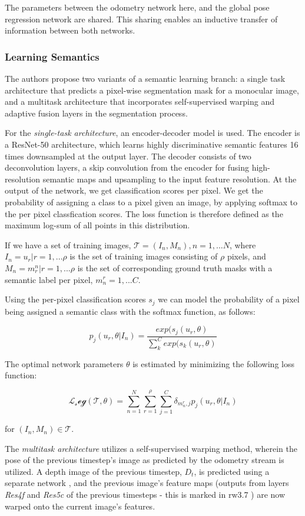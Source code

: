 The parameters between the odometry network here, and the global pose regression network are shared. This sharing enables an inductive transfer of information between
both networks. 

\subsubsection{Learning Semantics}
The authors propose two variants of a semantic learning branch: a single task architecture that predicts a pixel-wise segmentation mask for a monocular image, 
and a multitask architecture that incorporates self-supervised warping and adaptive fusion layers in the segmentation process. 


For the \emph{single-task architecture}, an encoder-decoder model is used. The encoder is a ResNet-50 architecture, which learns highly discriminative semantic features
16 times downsampled at the output layer. The decoder consists of two deconvolution layers, a skip convolution from the encoder for fusing high-resolution semantic maps
and upsampling to the input feature resolution. At the output of the network, we get classification scores per pixel. We get the probability of assigning a class to 
a pixel given an image, by applying softmax to the per pixel classfication scores. The loss function is therefore defined as the maximum log-sum of all points in this distribution. 


If we have a set of training images, $\mathcal{T} = {(I_n, M_n), n = 1,...N}$, where $I_n = {u_r | r = 1,...\rho}$ is the set of training images consisting of $\rho$ pixels, and $M_n = {m^n_r | r = 1,...\rho}$ is the set of corresponding ground truth masks with a semantic label per pixel, $m_n^r = {1,...C}$.

Using the per-pixel classification scores $s_j$ we can model the probability of a pixel being assigned a semantic class with the softmax function, as follows:

\[p_j(u_r, \theta | I_n) = \frac{exp(s_j(u_r, \theta)}{\sum_{k}^{C}exp(s_k(u_r, \theta)}\]

The optimal network parameters $\theta$ is estimated by minimizing the following loss function:

\[\mathcal{L_seg}(\mathcal{T}, \theta) = \sum_{n=1}^{N}\sum_{r=1}^{\rho}\sum_{j=1}^{C} \delta_{m_n^r, j}p_j(u_r, \theta | I_n)\]

for $(I_n, M_n) \in \mathcal{T}$.

The \emph{multitask architecture} utilizes a self-supervised warping method, wherein the pose of the previous timestep's image as predicted by the odometry stream is utilized.
A depth image of the previous timestep, $D_t$, is predicted using a separate network \textcite{DispNet}, and the previous image's feature maps (outputs from layers \emph{Res4f} and \emph{Res5c} of the previous timesteps - this is marked in \figurename{rw3.7} ) are now warped onto the current
image's features. 


